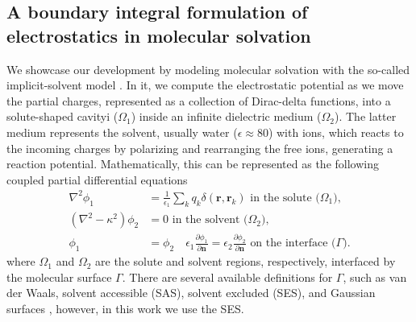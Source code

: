 \subsection{A boundary integral formulation of electrostatics in molecular solvation}

We showcase our development by modeling molecular solvation with the so-called implicit-solvent model \cite{RouxSimonson1999,DescherchiETal2015}. 
In it, we compute the electrostatic potential as we move the partial charges, represented as a collection of Dirac-delta functions, into a solute-shaped cavityi ($\Omega_1$) inside an infinite dielectric medium ($\Omega_2$). 
The latter medium represents the solvent, usually water ($\epsilon\approx 80$) with ions, which reacts to the incoming charges by polarizing and rearranging the free ions, generating a reaction potential.
Mathematically, this can be represented as the following coupled partial differential equations
%
\begin{align} \label{eq:pde}
\nabla^2\phi_1 &= \frac{1}{\epsilon_1}\sum_k q_k\delta(\mathbf{r},\mathbf{r}_k) \text{ in the solute ($\Omega_1$),}\nonumber\\
(\nabla^2-\kappa^2)\phi_2 &= 0 \text{ in the solvent ($\Omega_2$),}\nonumber\\
\phi_1 &= \phi_2 \quad \epsilon_1\frac{\partial \phi_1}{\partial\mathbf{n}} = \epsilon_2\frac{\partial \phi_2}{\partial\mathbf{n}} \text{ on the interface ($\Gamma$)}.
\end{align}
%
where $\Omega_1$ and $\Omega_2$ are the solute and solvent regions, respectively, interfaced by the molecular surface $\Gamma$.
There are several available definitions for $\Gamma$, such as van der Waals, solvent accessible (SAS), solvent excluded (SES), and Gaussian surfaces \cite{HarrisFenley2013}, however, in this work we use the SES.